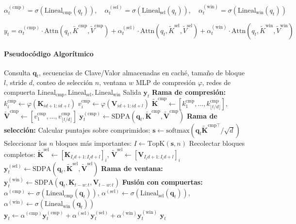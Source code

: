 \[
\alpha_t^{(\text{cmp})} = \sigma(\text{Lineal}_\text{cmp}(q_t)), \quad \alpha_t^{(\text{sel})} = \sigma(\text{Lineal}_\text{sel}(q_t)), \quad \alpha_t^{(\text{win})} = \sigma(\text{Lineal}_\text{win}(q_t))
\]

\[
y_t = \alpha_t^{(\text{cmp})} \cdot \text{Attn}(q_t, \tilde{K}^{\text{cmp}}, \tilde{V}^{\text{cmp}}) + \alpha_t^{(\text{sel})} \cdot \text{Attn}(q_t, \tilde{K}^{\text{sel}}, \tilde{V}^{\text{sel}}) + \alpha_t^{(\text{win})} \cdot \text{Attn}(q_t, \tilde{K}^{\text{win}}, \tilde{V}^{\text{win}})
\]

\paragraph{Pseudocódigo Algorítmico}

\begin{algorithm}[H]
\caption{NSA: Ramas Comprimida + Seleccionada + Ventana con Compuertas Aprendidas}
\begin{algorithmic}[1]
\Require Consulta $\mathbf{q}_t$, secuencias de Clave/Valor almacenadas en caché, tamaño de bloque $l$, stride $d$, conteo de selección $n$, ventana $w$
\Require MLP de compresión $\varphi$, redes de compuerta $\text{Lineal}_{\text{cmp}}, \text{Lineal}_{\text{sel}}, \text{Lineal}_{\text{win}}$
\Ensure Salida $\mathbf{y}_t$
\State \textbf{Rama de compresión:}
    \State $k_i^{\text{cmp}} \gets \varphi(\mathbf{K}_{id+1:id+l})$ 
    \State $v_i^{\text{cmp}} \gets \varphi(\mathbf{V}_{id+1:id+l})$
\EndFor
\State $\tilde{\mathbf{K}}^{\text{cmp}} \gets [k_1^{\text{cmp}}, \ldots, k_{\lfloor t/d \rfloor}^{\text{cmp}}]$, $\tilde{\mathbf{V}}^{\text{cmp}} \gets [v_1^{\text{cmp}}, \ldots, v_{\lfloor t/d \rfloor}^{\text{cmp}}]$
\State $\mathbf{y}_t^{(\text{cmp})} \gets \text{SDPA}(\mathbf{q}_t, \tilde{\mathbf{K}}^{\text{cmp}}, \tilde{\mathbf{V}}^{\text{cmp}})$
\State \textbf{Rama de selección:}
\State Calcular puntajes sobre comprimidos: $\mathbf{s} \gets \text{softmax}(\mathbf{q}_t \tilde{\mathbf{K}}^{\text{cmp}\top} / \sqrt{d})$
\State Seleccionar los $n$ bloques más importantes: $I \gets \mathrm{TopK}(\mathbf{s}, n)$
\State Recolectar bloques completos: $\tilde{\mathbf{K}}^{\text{sel}} \gets [\mathbf{K}_{I_i d+1:I_i d+l}]_i$, $\tilde{\mathbf{V}}^{\text{sel}} \gets [\mathbf{V}_{I_i d+1:I_i d+l}]_i$
\State $\mathbf{y}_t^{(\text{sel})} \gets \text{SDPA}(\mathbf{q}_t, \tilde{\mathbf{K}}^{\text{sel}}, \tilde{\mathbf{V}}^{\text{sel}})$
\State \textbf{Rama de ventana:}
\State $\mathbf{y}_t^{(\text{win})} \gets \text{SDPA}(\mathbf{q}_t, \mathbf{K}_{t-w:t}, \mathbf{V}_{t-w:t})$
\State \textbf{Fusión con compuertas:}
\State $\alpha^{(\text{cmp})} \gets \sigma(\text{Lineal}_{\text{cmp}}(\mathbf{q}_t))$, $\alpha^{(\text{sel})} \gets \sigma(\text{Lineal}_{\text{sel}}(\mathbf{q}_t))$, $\alpha^{(\text{win})} \gets \sigma(\text{Lineal}_{\text{win}}(\mathbf{q}_t))$
\State $\mathbf{y}_t \gets \alpha^{(\text{cmp})} \mathbf{y}_t^{(\text{cmp})} + \alpha^{(\text{sel})} \mathbf{y}_t^{(\text{sel})} + \alpha^{(\text{win})} \mathbf{y}_t^{(\text{win})}$
\Return $\mathbf{y}_t$
\end{algorithmic}
\end{algorithm}

